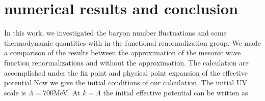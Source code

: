 \documentclass[%
reprint,
superscriptaddress,
showpacs,preprintnumbers,
 amsmath,amssymb,
 aps,
prd,
]{revtex4-1}
\begin{document}
\section{numerical results and conclusion}
In this work, we investigated the baryon number fluctuations and some thermodynamic quantities with in the functional 
renormalization group. We made a comparison of the results between the approximation of the mesonic wave function 
renormalizations and without the approximation. The calculation are accomplished under the fix point and physical point expansion of 
the effective potential.Now we give the initial conditions of our calculation. The initial UV scale is $\Lambda=700$MeV. At 
$k=\Lambda$ the initial effective potential can be written as
\end{document}
